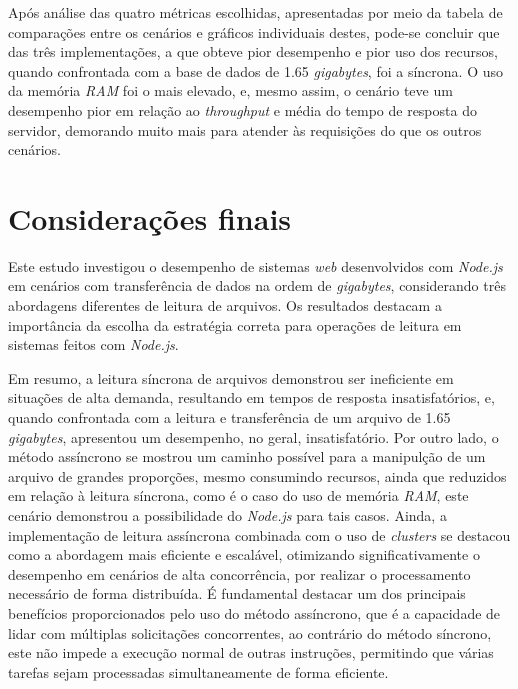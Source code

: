 \documentclass[12pt]{article}
\begin{document}
Após análise das quatro métricas escolhidas, apresentadas por meio da tabela de comparações
entre os cenários e gráficos individuais destes, pode-se concluir que das três 
implementações, a que obteve pior desempenho e pior uso dos recursos, quando confrontada 
com a base de dados de 1.65 \textit{gigabytes}, foi a síncrona. O uso da memória \textit{RAM}
foi o mais elevado, e, mesmo assim, o cenário teve um desempenho pior em relação ao 
\textit{throughput} e média do tempo de resposta do servidor, demorando muito mais
para atender às requisições do que os outros cenários.


\section{Considerações finais}

Este estudo investigou o desempenho de sistemas \textit{web} desenvolvidos com \textit{Node.js} em cenários com transferência de dados
na ordem de \textit{gigabytes}, considerando três abordagens diferentes de leitura de arquivos. Os resultados destacam
a importância da escolha da estratégia correta para operações de leitura em sistemas feitos com \textit{Node.js}.

Em resumo, a leitura síncrona de arquivos demonstrou ser ineficiente em situações de alta demanda, resultando em 
tempos de resposta insatisfatórios, e, quando confrontada com a leitura e transferência de um arquivo de 1.65 \textit{gigabytes},
apresentou um desempenho, no geral, insatisfatório. Por outro lado, o método assíncrono se mostrou um caminho possível para a manipulção de um arquivo de
grandes proporções, mesmo consumindo recursos, ainda que reduzidos em relação à leitura síncrona, como é o caso do uso de
memória \textit{RAM}, este cenário demonstrou a possibilidade do \textit{Node.js} para tais casos. Ainda, a implementação 
de leitura assíncrona combinada com o uso de \textit{clusters} se destacou como a abordagem mais eficiente e escalável, otimizando 
significativamente o desempenho em cenários de alta concorrência, por realizar o processamento necessário de forma distribuída. 
É fundamental destacar um dos principais benefícios proporcionados pelo uso do método assíncrono, que é a capacidade de lidar 
com múltiplas solicitações concorrentes, ao contrário do método síncrono, este não impede a execução normal 
de outras instruções, permitindo que várias tarefas sejam processadas simultaneamente de forma eficiente.



\end{document}

